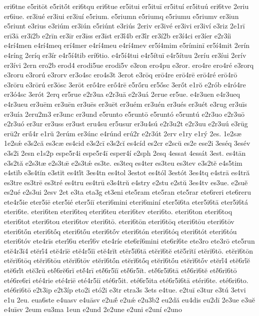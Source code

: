 {eri6tne
e5ritōt
e5ritṓt
eri6tqu
eri6tue
er5itui
er5ituī
er5ituí
er5ituú
eri6tve
2eriu
er6iue.
er3iué
er3iui
er3iuí
e5rium.
e5riumn
e5riumq
e5riumu
e5riumv
er3iun
e5riunt
e3rius
e3riúm
er3iún
e5riúnt
e3riús
2eriv
er3ivé
er3ivi
er3iví
e3riz
2e1rī
erī3ā
er3ī2b
e2rīn
er3īr
er3īss
er3īst
er3ī́4b
er3ī́r
er3í2b
er3í4ci
er3íer
e2r3íi
e4rí4men
e4rí4meq
erí4mer
e4rí4meu
e4rí4mev
er5í4mim
e5ríminī
er5í4mit
2erín
e4ríng
2eríq
er3ír
e4r5í4tib
erí6tio.
e4r5í4tui
e4r5ítuī
e4r5ítuu
2eríu
er3íui
2erív
er3ívi
2ern
ero2b
erod4
erodi5ue
erodi5v
e3ron
ero4pu
e3ror.
ero4re
ero4ré
e3rorq
e3roru
e3rorú
e3rorv
er3o4sc
ero4s3t
3erot
e3rōq
erō4re
erō4rē
erō4ré
erō4rō
e3rōru
e3rōrú
er3ōsc
3erōt
erṓ4re
erṓ4rē
e5rṓru
er5ṓsc
3erṓt
e1rŏ
e2rób
e4ró4re
er3ó4sc
3erót
2erq
er5rue
e2r3ua
e2r3uā
e2r3uá
2erue
er5ue.
e4r3uen
e4r3ueq
e4r3ueu
er3uēm
er3uēn
er3uēs
er3uēt
er3uém
er3uén
er3ués
er3uét
e3rug
er3uīs
er3uía
2eru2m3
er3unc
er3und
e5runto
e5runtō
e5runtó
e5runtú
e2r3uo
e2r3uō
e2r3uó
er3ur
er3uss
er3ust
eru4su
er5usur
er3u4sú
e2r3u2t
e2r3uu
e2r3uú
e3rūg
erū2r
erū́4r
e1rŭ
2erúm
er3únc
e4rúnd
erú2r
e2r3út
2erv
e1ry
e1rý
2es.
1e2sæ
1e2sǽ
e3s2că
es3cæ
es4cid
e3s2cī
e3s2cĭ
es4cíd
es2cr
e2scŭ
es2e
ese2i
3eséq
3esév
e3s2i
2esn
e1s2p
espe5r4i
espe5r4ī
esper4í
e2sph
2esq
4essat
4essát
3est.
es4tān
e3s2tă
e2s3tæ
e2s3tǣ
e2s3tǽ
es3te.
es3teq
es4ter
es3teu
es3tev
e3s2tĕ
e4s5tim
e4stĭb
e3s4tĭn
e3stĭt
es4tĭ́t
3es4tn
es4tol
3estot
es4tól
3estót
3es4tq
e4strā
es4tră
es3tre
es3trē
es3tré
es4tru
es4trū
e3s4trŭ
e4stry
e2stu
e2stŭ
3es4tv
es3ue.
e2suĕ
es2ué
e2s3ui
2esv
2et
e3ta
eta3g
et3eni
ete5ram
ete5ran
ete5rar
ete6reri
ete6reru
ete4r5ie
eter5iē
eter5ié
eter5iī
eteri6mini
eteri6miní
eter5i6ta
eter5i6tā
eter5i6tá
eteri6te.
eteri6ten
eteri6teq
eteri6teu
eteri6tev
eteri6to.
eteri6ton
eteri6toq
eteri6tot
eteri6tou
eteri6tov
eteri6tō.
eteri6tōn
eteri6tōq
eteri6tōu
eteri6tōv
eteri6tṓn
eteri6tṓq
eteri6tṓu
eteri6tṓv
eteri6tón
eteri6tóq
eteri6tót
eteri6tóu
eteri6tóv
ete4rīs
eterī́6u
eterī́6v
ete4ríe
ete6rí6mini
ete6rí6te
ete3ro
ete3rō
ete5run
etĕ4r3ī4
etĕrī́4
etĕ4rĭē
etĕ4r5ĭī
etĕ4rĭt
etĕr5ĭ6tā
etĕrĭ6tĕ
etĕ5rĭtĭ
etĕrĭ6tō.
etĕrĭ6tōn
etĕrĭ6tōq
etĕrĭ6tōu
etĕrĭ6tōv
etĕrĭ6tṓn
etĕrĭ6tṓq
etĕrĭ6tṓu
etĕrĭ6tṓv
etĕrĭ́4
etĕ6rĭ́ĕ
etĕ6rĭ́t
etĕ3rŭ
etĕ́6rĕ6rĭ
etĕ́4rī
etĕ́6r5ĭī
etĕ́6r5ĭt.
etĕ́6r5ĭ6tā
etĕ́6rĭ6tĕ
etĕ́6rĭ6tō
eté6re6ri
eté4rie
eté4riē
eté4r5iī
eté6r5it.
eté6r5ita
eté6r5i6tā
etéri6te.
eté6ri6to.
eté6ri6tō
e2t3ip
e2t3íp
eto2i
etó2i
e3tr
etra3s
3ets
e4tue.
e2tuī
e3tur
e3tú
3etvi
e1u
2eu.
eua6ste
e4uasv
e4uāsv
e2uǣ́
e2uǽ
e2u3b2
eu2dă
eu4dis
eu2dī
2e3ue
e3uĕ
e4uīsv
2eum
eu3ma
1eun
e2und
2e2une
e2uni
e2uní
e2uno
}
